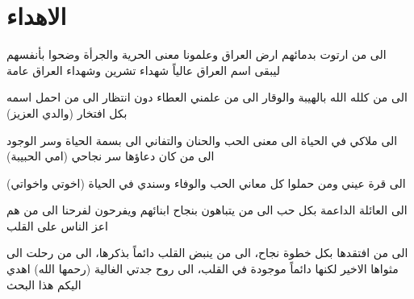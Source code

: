 \chapter*{الاهداء}

\begin{center}
	\amiri
الى من ارتوت بدمائهم ارض العراق وعلمونا معنى الحرية والجرأة وضحوا بأنفسهم
ليبقى اسم العراق عالياً شهداء تشرين وشهداء العراق عامة

الى من كلله الله بالهيبة والوقار الى من علمني العطاء دون انتظار الى من احمل اسمه بكل افتخار (والدي العزيز)

الى ملاكي في الحياة الى معنى الحب والحنان والتفاني الى بسمة الحياة وسر الوجود الى من كان دعاؤها سر نجاحي (امي الحبيبة)

الى قرة عيني ومن حملوا كل معاني الحب والوفاء وسندي في الحياة (اخوتي واخواتي)

الى العائلة الداعمة بكل حب الى من يتباهون بنجاح ابنائهم ويفرحون لفرحنا الى من هم اعز الناس على القلب 

الى من افتقدها بكل خطوة نجاح، الى من ينبض القلب دائماً بذكرها، الى من رحلت الى مثواها الاخير لكنها دائماً موجودة في القلب، الى روح جدتي الغالية (رحمها الله)
اهدي اليكم هذا البحث
\end{center}